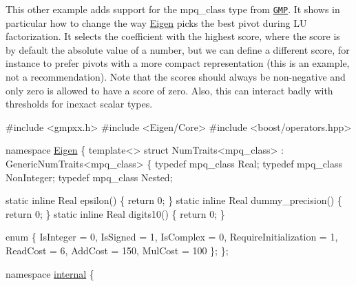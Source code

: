 This other example adds support for the {\ttfamily mpq\+\_\+class} type from \href{https://gmplib.org/}{\tt G\+MP}. It shows in particular how to change the way \hyperlink{namespace_eigen}{Eigen} picks the best pivot during LU factorization. It selects the coefficient with the highest score, where the score is by default the absolute value of a number, but we can define a different score, for instance to prefer pivots with a more compact representation (this is an example, not a recommendation). Note that the scores should always be non-\/negative and only zero is allowed to have a score of zero. Also, this can interact badly with thresholds for inexact scalar types.


\begin{DoxyCode}
\textcolor{preprocessor}{#include <gmpxx.h>}
\textcolor{preprocessor}{#include <Eigen/Core>}
\textcolor{preprocessor}{#include <boost/operators.hpp>}

\textcolor{keyword}{namespace }\hyperlink{namespace_eigen}{Eigen} \{
  \textcolor{keyword}{template}<> \textcolor{keyword}{struct }NumTraits<mpq\_class> : GenericNumTraits<mpq\_class>
  \{
    \textcolor{keyword}{typedef} mpq\_class Real;
    \textcolor{keyword}{typedef} mpq\_class NonInteger;
    \textcolor{keyword}{typedef} mpq\_class Nested;

    \textcolor{keyword}{static} \textcolor{keyword}{inline} Real epsilon() \{ \textcolor{keywordflow}{return} 0; \}
    \textcolor{keyword}{static} \textcolor{keyword}{inline} Real dummy\_precision() \{ \textcolor{keywordflow}{return} 0; \}
    \textcolor{keyword}{static} \textcolor{keyword}{inline} Real digits10() \{ \textcolor{keywordflow}{return} 0; \}

    \textcolor{keyword}{enum} \{
      IsInteger = 0,
      IsSigned = 1,
      IsComplex = 0,
      RequireInitialization = 1,
      ReadCost = 6,
      AddCost = 150,
      MulCost = 100
    \};
  \};

  \textcolor{keyword}{namespace }\hyperlink{namespaceinternal}{internal} \{


\end{DoxyCode}
